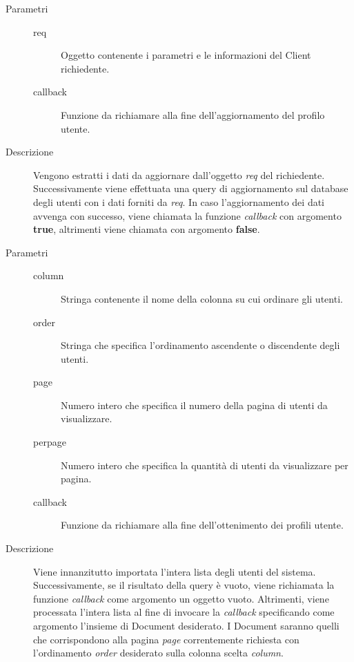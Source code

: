 \begin{description}
\begin{mldescription}
 		 \hfill
 			\begin{description}
 				\item[Parametri] \hfill
 					\begin{description}
 						\item[req]
 							Oggetto contenente i parametri e le informazioni del Client richiedente.
 						\item[callback]
 							Funzione da richiamare alla fine dell'aggiornamento del profilo utente.
 					\end{description}
 				\item[Descrizione]
 					Vengono estratti i dati da aggiornare dall'oggetto \textit{req} del richiedente. 								Successivamente viene effettuata una query di aggiornamento sul database degli utenti con  					i dati forniti da \textit{req}. In caso l'aggiornamento dei dati avvenga con successo, 						viene chiamata la funzione \textit{callback} con argomento \textbf{true}, altrimenti 							viene chiamata con argomento \textbf{false}.  
 			\end{description}
 			
 		 \hfill
 			\begin{description}
 				\item[Parametri] \hfill
 					\begin{description}
 						\item[column] \hfill
 							Stringa contenente il nome della colonna su cui ordinare gli utenti.
 						\item[order] \hfill
 							Stringa che specifica l'ordinamento ascendente o discendente degli utenti.
 						\item[page] \hfill
 							Numero intero che specifica il numero della pagina di utenti da visualizzare.
 						\item[perpage] \hfill
 							Numero intero che specifica la quantità di utenti da visualizzare per pagina.
 						\item[callback] \hfill
 							Funzione da richiamare alla fine dell'ottenimento dei profili utente.
 					\end{description}
 				\item[Descrizione]
 				Viene innanzitutto importata l'intera lista degli utenti del sistema. Successivamente, se il risultato della query è vuoto, viene richiamata la funzione \textit{callback} come argomento un oggetto vuoto. Altrimenti, viene processata l'intera lista al fine di invocare la \textit{callback} specificando come argomento l'insieme di Document desiderato. I Document saranno quelli che corrispondono alla pagina \textit{page} correntemente richiesta con l'ordinamento \textit{order} desiderato sulla colonna scelta \textit{column}.
 			\end{description}
 			

\end{mldescription}
\end{description}
